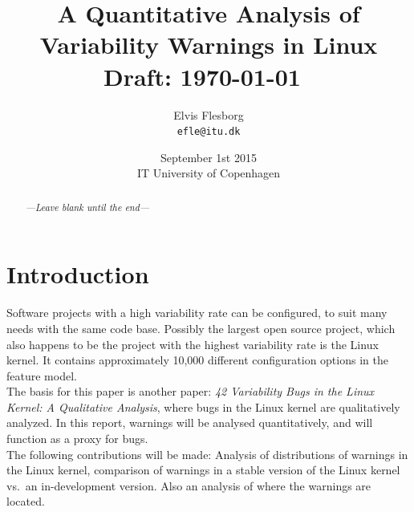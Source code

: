 \documentclass[a4paper,11pt]{report}
\begin{document}
\setlength{\parindent}{0cm}
\setlength{\unitlength}{1mm}

\date{September 1st 2015\\ IT University of Copenhagen}
\title{A Quantitative Analysis of Variability Warnings in Linux \\ Draft: 
    \today~\currenttime}
\author{Elvis Flesborg\\
\texttt{efle@itu.dk}}
\clearpage\maketitle
\thispagestyle{empty}
\newpage

\tableofcontents
\thispagestyle{empty}



\newpage

\setcounter{page}{1}


\begin{abstract}
    \emph{---Leave blank until the end---}

\end{abstract}


\chapter{Introduction}
Software projects with a high variability rate can be configured, to suit many
needs with the same code base. Possibly the largest open source project, which 
also happens to be the project with the highest variability rate
is the Linux kernel. It contains approximately 10,000 different configuration 
options in the feature model.
\\

The basis for this paper is another  paper: \emph{42 Variability 
Bugs in the Linux Kernel: A Qualitative Analysis}\cite{42bugs}, where bugs in 
the Linux kernel are qualitatively analyzed. In this report, warnings will be 
analysed quantitatively, and will function as a proxy for bugs.
\\

The following contributions will be made: Analysis of distributions of warnings 
in the Linux kernel, comparison of warnings in a stable version of the Linux 
kernel vs.\ an in-development version. Also an analysis of where the warnings 
are located.
\end{document}
